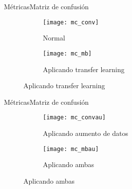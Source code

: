 \documentclass[aspectratio = 169]{beamer}
\begin{document}
			\begin{frame}{Métricas}{Matriz de confusión}
				\begin{figure}
					\centering
					\begin{subfigure}{.4\textwidth}
						\centering
						\texttt{[image: mc\_conv]}
						\caption{Normal}
						\label{fig:mc_conv}
					\end{subfigure}\hfill
					\begin{subfigure}{.4\textwidth}
						\centering
						\texttt{[image: mc\_mb]}
						\caption{Aplicando transfer learning}
						\label{fig:mc_mb}
					\end{subfigure}
					\label{fig:mc}
				\end{figure}
			\end{frame}
			\begin{frame}{Métricas}{Matriz de confusión}
				\begin{figure}
					\centering
					\begin{subfigure}{.4\textwidth}
						\addtocounter{subfigure}{2}
						\centering
						\texttt{[image: mc\_convau]}
						\caption{Aplicando aumento de datos}
						\label{fig:mc_convau}
					\end{subfigure}\hfill
					\begin{subfigure}{.4\textwidth}
						\centering
						\texttt{[image: mc\_mbau]}
						\caption{Aplicando ambas}
						\label{fig:mc_mbau}
					\end{subfigure}
				\end{figure}
			\end{frame}
\end{document}
